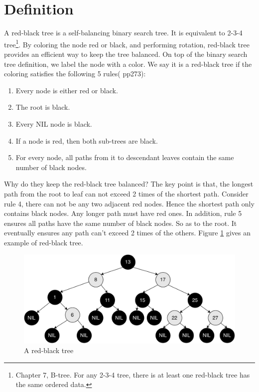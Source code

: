 \documentclass[b5paper]{article}
\begin{document}
\begin{Exercise}
\end{Exercise}

\section{Definition}

A red-black tree is a self-balancing binary search tree\cite{wiki-rbt}. It is equivalent to 2-3-4 tree\footnote{Chapter 7, B-tree. For any 2-3-4 tree, there is at least one red-black tree has the same ordered data.}. By coloring the node red or black, and performing rotation, red-black tree provides an efficient way to keep the tree balanced. On top of the binary search tree definition, we label the node with a color. We say it is a red-black tree if the coloring satisfies the following 5 rules(\cite{CLRS} pp273):

\begin{enumerate}
\item Every node is either red or black.
\item The root is black.
\item Every NIL node is black.
\item If a node is red, then both sub-trees are black.
\item For every node, all paths from it to descendant leaves contain the same number of black nodes.
\end{enumerate}

Why do they keep the red-black tree balanced? The key point is that, the longest path from the root to leaf can not exceed 2 times of the shortest path. Consider rule 4, there can not be any two adjacent red nodes. Hence the shortest path only contains black nodes. Any longer path must have red ones. In addition, rule 5 ensures all paths have the same number of black nodes. So as to the root. It eventually ensures any path can't exceed 2 times of the others\cite{wiki-rbt}. Figure \ref{fig:rbt-example-with-nil} gives an example of red-black tree.

\begin{figure}[htbp]
  \centering
  \includegraphics[scale=0.35]{img/rbt-example-with-nil}
  \caption{A red-black tree}
  \label{fig:rbt-example-with-nil}
\end{figure}
\end{document}
